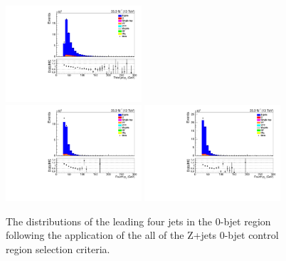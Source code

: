 \begin{figure}[!ht]
\includegraphics[width=0.45\textwidth]{figs/background-estimation/plots/unblinded/DY_control_old_prompt_mumu_ttbarInc/thirdJetPt_SingleTop_wMass_mumu.pdf}
\\
\includegraphics[width=0.45\textwidth]{figs/background-estimation/plots/unblinded/DY_control_old_prompt_ee_ttbarInc/fourthJetPt_SingleTop_wMass_ee.pdf}
\includegraphics[width=0.45\textwidth]{figs/background-estimation/plots/unblinded/DY_control_old_prompt_mumu_ttbarInc/fourthJetPt_SingleTop_wMass_mumu.pdf}
\caption{
The distributions of the leading four jets \pt in the 0-bjet region following the application of the all of the Z+jets 0-bjet control region selection criteria.
}
\label{fig:App_CR_LO_jetPt_wMass}
\end{figure}


